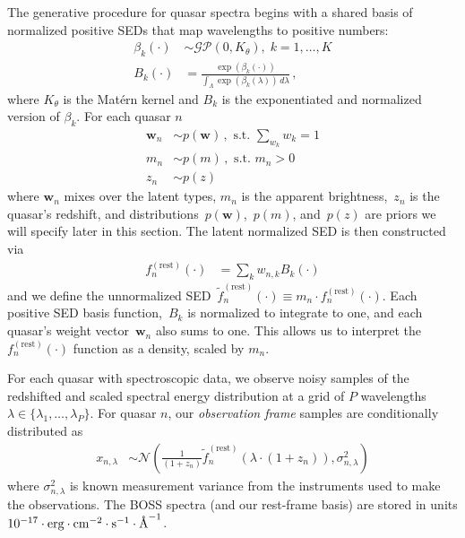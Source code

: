 \documentclass{article}
\newcommand{\angstrom}{\textup{\AA}}
\begin{document}
The generative procedure for quasar spectra begins with a shared basis of normalized positive SEDs that map wavelengths to positive numbers:
\begin{align}
  \beta_k(\cdot) &\sim \mathcal{GP}(0, K_\theta),\; k=1, \dots, K\\
  B_k(\cdot) &= \frac{\exp(\beta_k(\cdot))}{\int_\Lambda \exp(\beta_k(\lambda))\, d\lambda}   \, ,
\end{align}
where $K_{\theta}$ is the Mat\'{e}rn kernel and $B_k$ is the exponentiated and normalized version of $\beta_k$. For each quasar $n$
\begin{align}
  \mathbf{w}_n &\sim p(\mathbf{w}) \, , \text{ s.t. } \sum_{w_k} w_k = 1  \\
  m_n  &\sim p(m) \, , \text{ s.t. } m_n > 0 \\
  z_n &\sim p(z)
\end{align}
where $\mathbf{w}_n$ mixes over the latent types, $m_n$ is the apparent brightness,~$z_n$ is the quasar's redshift, and distributions~$p(\mathbf{w})$,~$p(m)$, and~$p(z)$ are priors we will specify later in this section. %
The latent normalized SED is then constructed via
\begin{align}
  f^{(\text{rest})}_n(\cdot) &= \sum_{k} w_{n,k} B_k(\cdot)
  \label{eqn:restsed}
\end{align}
and we define the unnormalized SED~${\tilde f^{(\text{rest})}_n(\cdot) \equiv m_n \cdot f^{(\text{rest})}_n(\cdot)}$. %
Each positive SED basis function,~$B_k$ is normalized to integrate to one, and each quasar's weight vector~$\mathbf{w}_n$ also sums to one.
This allows us to interpret the~$f^{(\text{rest})}_n(\cdot)$ function as a density, scaled by $m_n$. 

For each quasar with spectroscopic data, we observe noisy samples of the redshifted and scaled spectral energy distribution at a grid of $P$ wavelengths ${\lambda \in \{\lambda_1, \dots, \lambda_P \}}$.
For quasar $n$, our \emph{observation frame} samples are conditionally distributed as
\begin{align}
  x_{n, \lambda} 
    &\sim \mathcal{N}\left( \frac{1}{(1 + z_n)} \tilde f_n^{(\text{rest})}( \lambda \cdot (1 + z_n) ), \sigma_{n,\lambda}^2 \right)
    \label{eq:spec} 
\end{align}
where $\sigma_{n, \lambda}^2$ is known measurement variance from the instruments used to make the observations. 
The BOSS spectra (and our rest-frame basis) are stored in units ${10^{-17} \cdot \text{erg} \cdot \text{cm}^{-2} \cdot \text{s}^{-1} \cdot \angstrom^{-1}}$.  
\end{document}
